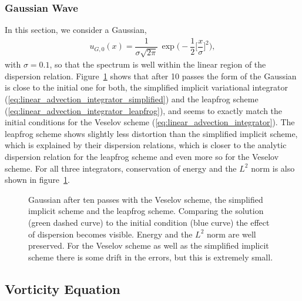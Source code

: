 \documentclass[12pt,a4paper,reqno]{article}
\begin{document}
\subsubsection*{Gaussian Wave}

In this section, we consider a Gaussian,
\begin{align}
u_{G,0} (x) = \dfrac{1}{\sigma \sqrt{2 \pi}} \, \exp \bigg( - \dfrac{1}{2} \bigg[ \dfrac{x}{\sigma} \bigg]^2 \bigg) ,
\end{align}
with $\sigma = 0.1$, so that the spectrum is well within the linear region of the dispersion relation.
Figure~\ref{fig:linear_advection_gaussian_timetraces} shows that after 10 passes the form of the Gaussian is close to the initial one for both, the simplified implicit variational integrator (\ref{eq:linear_advection_integrator_simplified}) and the leapfrog scheme (\ref{eq:linear_advection_integrator_leapfrog}), and seems to exactly match the initial conditions for the Veselov scheme (\ref{eq:linear_advection_integrator}). The leapfrog scheme shows slightly less distortion than the simplified implicit scheme, which is explained by their dispersion relations, which is closer to the analytic dispersion relation for the leapfrog scheme and even more so for the Veselov scheme.
For all three integrators, conservation of energy and the $L^{2}$ norm is also shown in figure~\ref{fig:linear_advection_gaussian_timetraces}.

\begin{figure}[p]
	\centering
	
	
 	\caption{Gaussian after ten passes with the Veselov scheme, the simplified implicit scheme and the leapfrog scheme. Comparing the solution (green dashed curve) to the initial condition (blue curve) the effect of dispersion becomes visible. Energy and the $L^{2}$ norm are well preserved. For the Veselov scheme as well as the simplified implicit scheme there is some drift in the errors, but this is extremely small.}
	\label{fig:linear_advection_gaussian_timetraces}
\end{figure}

\clearpage

\subsection{Vorticity Equation}
\label{sec:vorticity}
\end{document}
